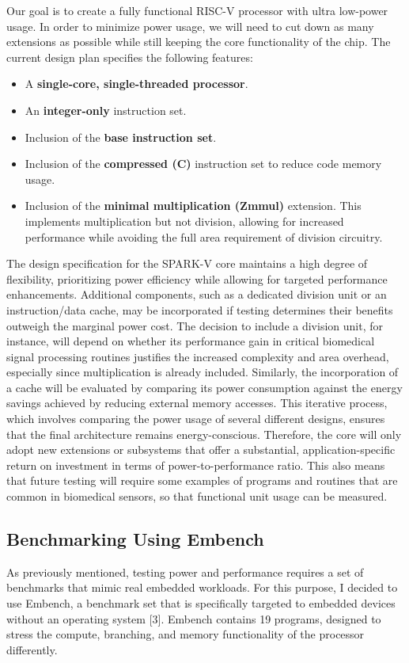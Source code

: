 \documentclass[conference]{IEEEtran}
\begin{document}
Our goal is to create a fully functional RISC-V processor with ultra low-power usage. In order to minimize power usage, we will need to cut down as many extensions as possible while still keeping the core functionality of the chip. The current design plan specifies the following features:


\begin{itemize}
    \item A \textbf{single-core, single-threaded processor}.
    \item An \textbf{integer-only} instruction set.
    \item Inclusion of the \textbf{base instruction set}.
    \item Inclusion of the \textbf{compressed (C)} instruction set to reduce code memory usage.
    \item Inclusion of the \textbf{minimal multiplication (Zmmul)} extension. This implements multiplication but not division, allowing for increased performance while avoiding the full area requirement of division circuitry.
\end{itemize}

The design specification for the SPARK-V core maintains a high degree of flexibility, prioritizing power efficiency while allowing for targeted performance enhancements. Additional components, such as a dedicated division unit or an instruction/data cache, may be incorporated if testing determines their benefits outweigh the marginal power cost. The decision to include a division unit, for instance, will depend on whether its performance gain in critical biomedical signal processing routines justifies the increased complexity and area overhead, especially since multiplication is already included. Similarly, the incorporation of a cache will be evaluated by comparing its power consumption against the energy savings achieved by reducing external memory accesses. This iterative process, which involves comparing the power usage of several different designs, ensures that the final architecture remains energy-conscious. Therefore, the core will only adopt new extensions or subsystems that offer a substantial, application-specific return on investment in terms of power-to-performance ratio. This also means that future testing will require some examples of programs and routines that are common in biomedical sensors, so that functional unit usage can be measured.

\subsection{Benchmarking Using Embench}
As previously mentioned, testing power and performance requires a set of benchmarks that mimic real embedded workloads. For this purpose, I decided to use Embench, a benchmark set that is specifically targeted to embedded devices without an operating system [3]. Embench contains 19 programs, designed to stress the compute, branching, and memory functionality of the processor differently.
\end{document}
